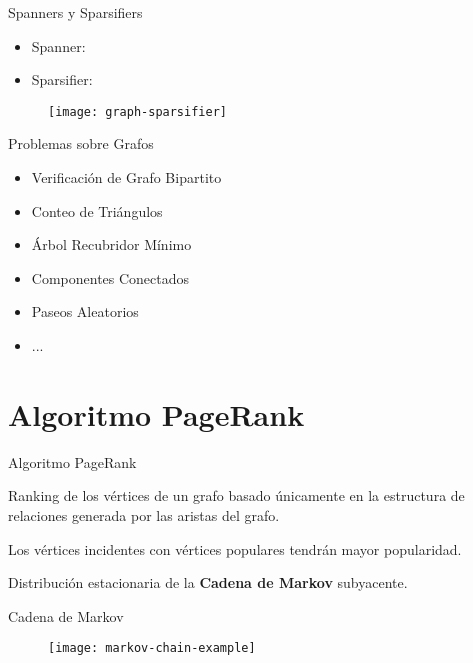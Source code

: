 \documentclass[12pt]{beamer}
\begin{document}
    \begin{frame}[fragile]{Spanners y Sparsifiers}

      \begin{itemize}
        \item Spanner:
        \item Sparsifier:
      \end{itemize}

      \begin{figure}
        \texttt{[image: graph-sparsifier]}
        \caption{}
        \label{}
      \end{figure}

    \end{frame}

    \begin{frame}[fragile]{Problemas sobre Grafos}

      \begin{itemize}
        \item Verificación de Grafo Bipartito
        \item Conteo de Triángulos
        \item Árbol Recubridor Mínimo
        \item Componentes Conectados
        \item Paseos Aleatorios
        \item ...
      \end{itemize}

    \end{frame}

  \section{Algoritmo PageRank}

    \begin{frame}[fragile]{Algoritmo PageRank}

      Ranking de los vértices de un grafo basado únicamente en la estructura de relaciones generada por las aristas del grafo.

      Los vértices incidentes con vértices populares tendrán mayor popularidad.

      Distribución estacionaria de la \textbf{Cadena de Markov} subyacente.

    \end{frame}

    \begin{frame}[fragile]{Cadena de Markov}

      \begin{figure}
        \texttt{[image: markov-chain-example]}
        \caption{}
        \label{}
      \end{figure}

    \end{frame}
\end{document}
